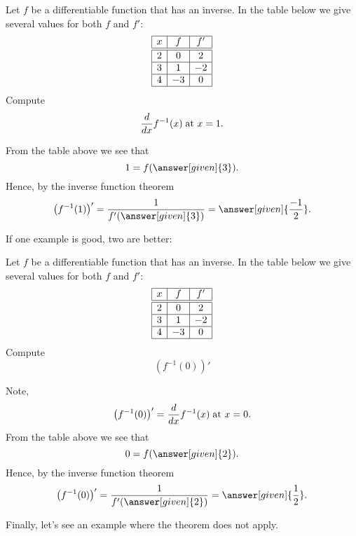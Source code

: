 \documentclass{ximera}
\begin{document}
\begin{example}
  Let $f$ be a differentiable function that has an inverse. In the
  table below we give several values for both $f$ and $f'$:
  \[
  \begin{array}{|c|c|c|}\hline
    x & f  & f' \\ \hline \hline
    2 & 0  & 2  \\ \hline
    3 & 1  & -2 \\ \hline
    4 & -3 & 0  \\ \hline
  \end{array}
  \]
  Compute
  \[
  \frac{d}{dx} f^{-1}(x)\;\text{at $x=1$.}
  \]
  \begin{explanation}
    From the table above we see that
    \[
    1 = f(\answer[given]{3}).
    \]
    Hence, by the inverse function theorem
    \[
    \left(f^{-1}(1)\right)' = \frac{1}{f'(\answer[given]{3})} = \answer[given]{\frac{-1}{2}}.
    \]
  \end{explanation}
\end{example}

If one example is good, two are better:

\begin{example}
  Let $f$ be a differentiable function that has an inverse. In the
  table below we give several values for both $f$ and $f'$:
  \[
  \begin{array}{|c|c|c|}\hline
    x & f  & f' \\ \hline \hline
    2 & 0  & 2  \\ \hline
    3 & 1  & -2 \\ \hline
    4 & -3 & 0  \\ \hline
  \end{array}
  \]
  Compute
  \[
  \left(f^{-1}(0)\right)'
  \]
  \begin{explanation}
    Note,
    \[
    \left(f^{-1}(0)\right)' = \frac{d}{dx} f^{-1}(x)\;\text{at $x=0$.}
    \]
    From the table above we see that
    \[
    0 = f(\answer[given]{2}).
    \]
    Hence, by the inverse function theorem
    \[
    \left(f^{-1}(0)\right)' = \frac{1}{f'(\answer[given]{2})} = \answer[given]{\frac{1}{2}}.
    \]
  \end{explanation}
\end{example}

Finally, let's see an example where the theorem does not apply.
\end{document}
